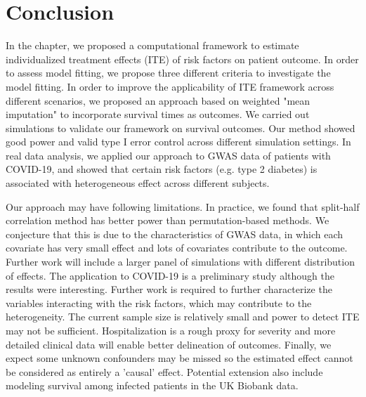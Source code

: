 \section{Conclusion}
\label{sec:ite_conclusion}
  In the chapter, we proposed a computational framework to estimate individualized treatment effects (ITE) of risk factors on patient outcome. In order to assess model fitting, we propose three different criteria to investigate the model fitting. In order to improve the applicability of ITE framework across different scenarios, we proposed an approach based on weighted "mean imputation" to incorporate survival times as outcomes. We carried out simulations to validate our framework on survival outcomes. Our method showed good power and valid type I error control across different simulation settings. In real data analysis, we applied our approach to GWAS data of patients with COVID-19, and showed that certain risk factors (e.g. type 2 diabetes) is associated with heterogeneous effect across different subjects. 

  Our approach may have following limitations. In practice, we found that split-half correlation method has better power than permutation-based methods. We conjecture that this is due to the characteristics of GWAS data, in which each covariate has very small effect and lots of covariates contribute to the outcome. Further work will include a larger panel of simulations with different distribution of effects. The application to COVID-19 is a preliminary study although the results were interesting. Further work is required to further characterize the variables interacting with the risk factors, which may contribute to the heterogeneity. The current sample size is relatively small and power to detect ITE may not be sufficient. Hospitalization is a rough proxy for severity and more detailed clinical data will enable better delineation of outcomes. Finally, we expect some unknown confounders may be missed so the estimated effect cannot be considered as entirely a 'causal' effect. Potential extension also include modeling survival among infected patients in the UK Biobank data. 
\chapterend